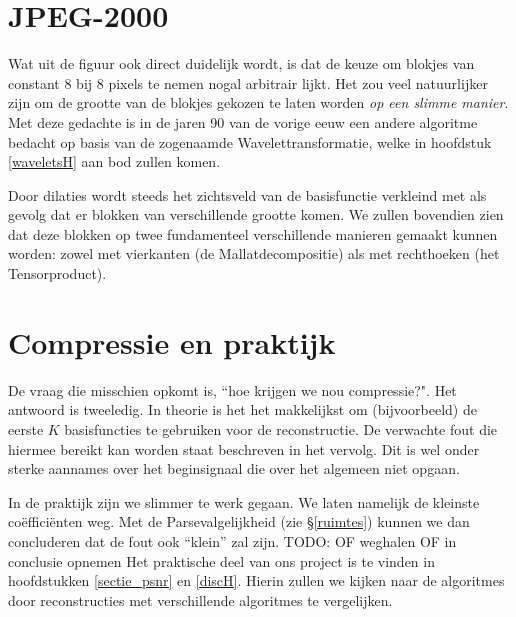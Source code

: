 \documentclass[11pt]{uvamath}
\theoremstyle{plain}
\theoremstyle{definition}
\theoremstyle{remark}
\begin{document}
\section*{JPEG-2000}
Wat uit de figuur ook direct duidelijk wordt, is dat de keuze om blokjes van constant 8 bij 8 pixels te nemen nogal arbitrair lijkt. Het zou veel natuurlijker zijn om de grootte van de blokjes gekozen te laten worden \emph{op een slimme manier}. Met deze gedachte is in de jaren 90 van de vorige eeuw een andere algoritme bedacht op basis van de zogenaamde Wavelettransformatie, welke in hoofdstuk \ref{waveletsH} aan bod zullen komen. 

Door dilaties wordt steeds het zichtsveld van de basisfunctie verkleind met als gevolg dat er blokken van verschillende grootte komen. We zullen bovendien zien dat deze blokken op twee fundamenteel verschillende manieren gemaakt kunnen worden: zowel met vierkanten (de Mallatdecompositie) als met rechthoeken (het Tensorproduct).

\section*{Compressie en praktijk}
De vraag die misschien opkomt is, ``hoe krijgen we nou compressie?". Het antwoord is tweeledig. In theorie is het het makkelijkst om (bijvoorbeeld) de eerste $K$ basisfuncties te gebruiken voor de reconstructie. De verwachte fout die hiermee bereikt kan worden staat beschreven in het vervolg. Dit is wel onder sterke aannames over het beginsignaal die over het algemeen niet opgaan.

In de praktijk zijn we slimmer te werk gegaan. We laten namelijk de kleinste co\"effici\"enten weg. Met de Parsevalgelijkheid (zie \S \ref{ruimtes}) kunnen we dan concluderen dat de fout ook ``klein'' zal zijn. TODO: OF weghalen OF in conclusie opnemen Het praktische deel van ons project is te vinden in hoofdstukken \ref{sectie_psnr} en \ref{discH}. Hierin zullen we kijken naar de algoritmes door reconstructies met verschillende algoritmes te vergelijken.
\end{document}
